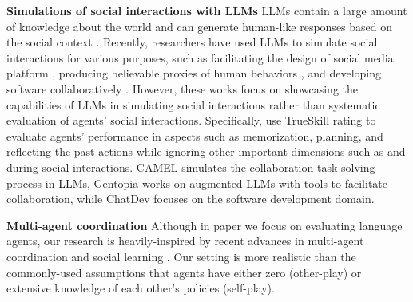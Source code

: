 \textbf{Simulations of social interactions with LLMs}
LLMs contain a large amount of knowledge about the world and can generate human-like responses based on the social context \citep{Park2023GenerativeAI, kim2023soda, west-etal-2022-symbolic}.
Recently, researchers have used LLMs to simulate social interactions for various purposes, such as facilitating the design of social media platform \citep{park2022socialsimulacra}, producing believable proxies of human behaviors \citep{Park2023GenerativeAI}, and developing software collaboratively \citep{qian2023communicative}.
However, these works focus on showcasing the capabilities of LLMs in simulating social interactions rather than systematic evaluation of agents' social interactions.
Specifically, \citet{Park2023GenerativeAI} use TrueSkill rating to evaluate agents' performance in aspects such as memorization, planning, and reflecting the past actions while ignoring other important dimensions such as \socialrules and \secret during social interactions. 
CAMEL \cite{li2023camel} simulates the collaboration task solving process in LLMs, Gentopia \cite{xu2023gentopia} works on augmented LLMs with tools to facilitate collaboration, while ChatDev \cite{qian2023communicative} focuses on the software development domain.


\textbf{Multi-agent coordination} Although in paper we focus on evaluating language agents, our research is heavily-inspired by recent advances in multi-agent coordination and social learning \cite{lowe2017multi,mckee2020social,hu2020otherplay,zhu2021few,liu2022computational,trivedi2023melting}. Our setting is more realistic than the commonly-used assumptions that agents have either zero (other-play) or extensive knowledge of each other's policies (self-play).



